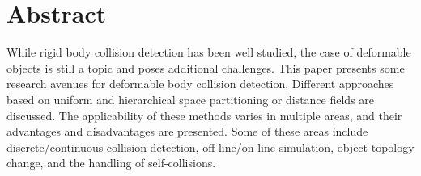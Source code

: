 
\noindent\makebox[\linewidth]{\rule{\textwidth}{2pt}} 

\section*{Abstract}
\label{Abstract}

While rigid body collision detection has been well studied, the case of deformable objects is still a topic and poses additional challenges. This paper presents some research avenues for deformable body collision detection. Different approaches based on uniform and hierarchical space partitioning or distance fields are discussed. The applicability of these methods varies in multiple areas, and their advantages and disadvantages are presented. Some of these areas include discrete/continuous collision detection, off-line/on-line simulation, object topology change, and the handling of self-collisions.

\noindent\makebox[\linewidth]{\rule{\textwidth}{2pt}} 